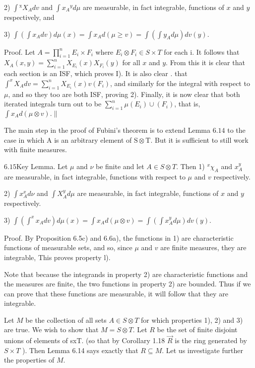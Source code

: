 {{{2) $\int{ }^{\mathrm{x}} X_{A} d v$ and $\int x_{A}{ }^{y} d \mu$ are measurable, in fact integrable, functions of $x$ and $y$ respectively, and

3) $\int\left(\int x_{A} d v\right) d \mu(x)=\int x_{A} d(\mu \geq v)=\int\left(\int y_{A} d \mu\right) d v(y)$.

Proof. Let $A=\prod_{i=1}^{n} E_{i} \times F_{i}$ where $E_{i} \otimes F_{i} \in S \times T$ for each i. It follows that $X_{A}(x, y)=\sum_{i=1}^{n} X_{E_{i}}(x) X_{F_{i}}(y)$ for all $x$ and $y$. From this it is clear that each section is an ISF, which proves I). It is also clear . that $\int^{x} X_{A} d v=\sum_{i=1}^{n} X_{E_{i}}(x) v\left(F_{i}\right)$, and similarly for the integral with respect to $\mu$, and so they too are both ISF, proving 2). Finally, it is now clear that both iterated integrals turn out to be $\sum_{i=1}^{n} \mu\left(E_{i}\right) \cup\left(F_{i}\right)$, that is, $\int x_{A} d(\mu \otimes v) . \|$

The main step in the proof of Fubini's theorem is to extend Lemma $6.14$ to the case in which A is an arbitrary element of $\mathrm{S} \otimes \mathrm{T}$. But it is sufficient to still work with finite measures.

$6.15 \mathrm{Key}$ Lemma. Let $\mu$ and $\nu$ be finite and let $A \in S \otimes T$. Then 1) ${ }^{x} \chi_{A}$ and $x_{A}^{y}$ are measurable, in fact integrable, functions with respect to $\mu$ and $v$ respectively.

2) $\int x_{A}^{x} d \nu$ and $\int X_{A}^{y} d \mu$ are measurable, in fact integrable, functions of $x$ and $y$ respectively.

3) $\int\left(\int^{x} x_{A} d v\right) d \mu(x)=\int x_{A} d(\mu \otimes v)=\int\left(\int x_{A}^{y} d \mu\right) d v(y)$.

Proof. By Proposition 6.5c) and 6.6a), the functions in 1) are characteristic functions of measurable sets, and so, since $\mu$ and $v$ are finite measures, they are integrable, This proves property l).

Note that because the integrands in property 2) are characteristic functions and the measures are finite, the two functions in property 2) are bounded. Thus if we can prove that these functions are measurable, it will follow that they are integrable.

Let $M$ be the collection of all sets $A \in S \otimes T$ for which properties 1), 2) and 3) are true. We wish to show that $M=S \otimes T$. Let $R$ be the set of finite disjoint unions of elements of sxT. (so that by Corollary 1.18 $\vec{R}$ is the ring generated by $S \times T$ ). Then Lemma 6.14 says exactly that $R \subseteq M$. Let us investigate further the properties of $M$.

}}}
